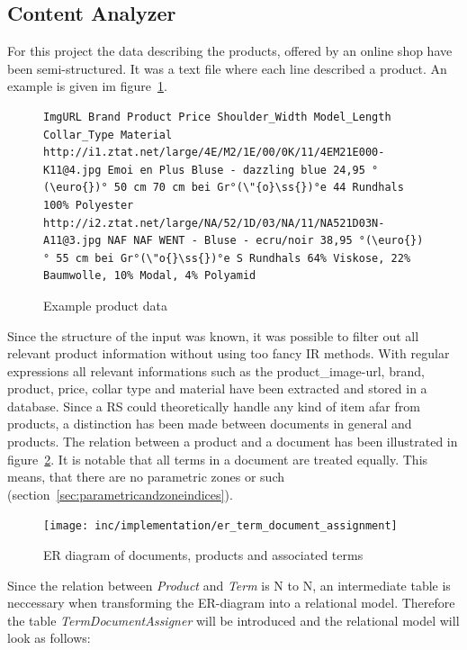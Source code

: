 \subsection{Content Analyzer}
For this project the data describing the products, offered by an online shop have been semi-structured.
It was a text file where each line described a product.
An example is given im figure~\ref{fig:productdata}.
\begin{figure}[h]
\begin{lstlisting}
ImgURL Brand Product Price Shoulder_Width Model_Length Collar_Type Material
http://i1.ztat.net/large/4E/M2/1E/00/0K/11/4EM21E000-K11@4.jpg Emoi en Plus Bluse - dazzling blue 24,95 °(\euro{})° 50 cm 70 cm bei Gr°(\"{o}\ss{})°e 44 Rundhals 100% Polyester
http://i2.ztat.net/large/NA/52/1D/03/NA/11/NA521D03N-A11@3.jpg NAF NAF WENT - Bluse - ecru/noir 38,95 °(\euro{})° 55 cm bei Gr°(\"o{}\ss{})°e S Rundhals 64% Viskose, 22% Baumwolle, 10% Modal, 4% Polyamid
\end{lstlisting}
    \caption{Example product data}
    \label{fig:productdata}
\end{figure}
Since the structure of the input was known, it was possible to filter out all relevant product information without using too fancy IR methods.
With regular expressions all relevant informations such as the product\_image-url, brand, product, price, collar type and material have been extracted and stored in a database.
Since a RS could theoretically handle any kind of item afar from products, a distinction has been made between documents in general and products.
The relation between a product and a document has been illustrated in figure~\ref{fig:ertermdocumentassignment}.
It is notable that all terms in a document are treated equally.
This means, that there are no parametric zones or such (section~\ref{sec:parametricandzoneindices}).
\begin{figure}[h]
    \center
    \texttt{[image: inc/implementation/er\_term\_document\_assignment]}
    \caption{ER diagram of documents, products and associated terms}
    \label{fig:ertermdocumentassignment}
\end{figure}
Since the relation between \textit{Product} and \textit{Term} is N to N, an intermediate table is neccessary when transforming the ER-diagram into a relational model.
Therefore the table \textit{TermDocumentAssigner} will be introduced and the relational model will look as follows:

